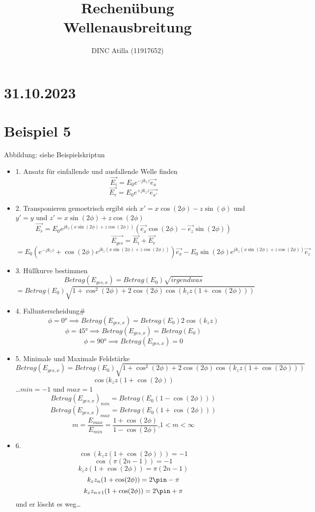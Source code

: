 \documentclass[a4paper]{article}
\title{Rechenübung\\Wellenausbreitung}
\author{DINC Atilla (11917652)}
\begin{document}
\normalsize
\maketitle

\section*{31.10.2023}
\section*{Beispiel 5}
Abbildung: siehe Beispielskriptun

\begin{itemize}
    \item 1. Ansatz für einfallende und ausfallende Welle finden
        \[ \vec{E_{i}}=E_{0}e^{-jk_{z}z} \vec{e_{x}} \]
        \[ \vec{E_{r}}=E_{0}e^{+jk_{z}z}\vec{e_{x'}} \]
    \item 2. Transponieren
        gemoetrisch ergibt sich $x'=x\cos(2\phi)-z\sin(\phi)$
        und $y'=y$ 
        und $z'=x\sin(2\phi)+z\cos(2\phi)$
        \[ \vec{E_{r}}=E_{0}e^{jk_{z}(x\sin(2\phi)+z\cos(2\phi))}(\vec{e_{x}}\cos(2\phi)-\vec{e_{z}}\sin(2\phi)) \]
        \[\vec{E_{ges}}=\vec{E_{i}}+\vec{E_{r}} \]
        \[ =E_{0}(e^{-jk_{z}z}+\cos(2\phi)e^{jk_{z}(x\sin(2\phi)+z\cos(2\phi))})\vec{e_{x}}
        -E_{0}\sin(2\phi)e^{jk_{z}(x\sin(2\phi)+z\cos(2\phi))}\vec{e_{z}}\]
    \item 3. Hüllkurve bestimmen
        \[ Betrag(E_{ges,x})=Betrag(E_{0})\sqrt{irgendwas}  \]
        \[ =Betrag(E_{0}) \sqrt{1+\cos^{2}(2\phi) + 2\cos(2\phi)\cos(k_{z}z(1+\cos(2\phi)))} \]
    \item 4. Fallunterscheidung#
        \[ \phi =0° \implies Betrag(E_{ges,x})=Betrag(E_{0})2\cos(k_{z}z)  \]
        \[ \phi =45° \implies Betrag(E_{ges,x})=Betrag(E_{0})  \]
        \[ \phi =90° \implies Betrag(E_{ges,x})=0  \]
    \item 5. Minimale und Maximale Feldstärke
        \[ Betrag(E_{ges,x})=Betrag(E_{0}) \sqrt{1+\cos^{2}(2\phi) + 2\cos(2\phi)\cos(k_{z}z(1+\cos(2\phi)))} \]
        \[\cos(k_{z}z(1+\cos(2\phi))\]
        \ldots $min = -1$ und  $max=1$
        \[ Betrag(E_{ges,x})_{min}=Betrag(E_{0}(1-\cos(2\phi)))\]
        \[ Betrag(E_{ges,x})_{max}=Betrag(E_{0}(1+\cos(2\phi)))\]
        \[ m=\frac{E_{max}}{E_{min}}=\frac{1+\cos(2\phi)}{1-\cos(2\phi)}\text{,} 1 <m < \infty \]
    \item 6.
        \[ \cos(k_{z}z(1+\cos(2\phi)))=-1 \]
        \[ \cos(\pi(2n-1))=-1 \]
        \[ k_{z}z(1+\cos(2\phi))=\pi(2n-1) \]
        \[ k_{z}z_{n}(1+\cos(2\phi))=2\pin-\pi \]
        \[ k_{z}z_{n+1}(1+\cos(2\phi))=2\pin+\pi \]
        und er löscht es weg\ldots
\end{itemize}
\end{document}

